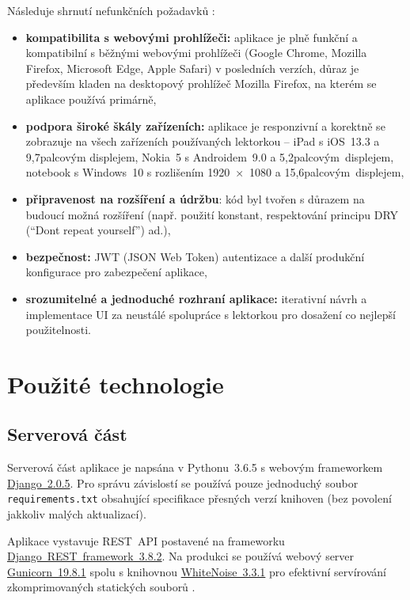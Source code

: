 Následuje shrnutí nefunkčních požadavků \cite{bp}:
\begin{itemize}
    \item \textbf{kompatibilita s webovými prohlížeči:} aplikace je plně funkční a kompatibilní s běžnými webovými prohlížeči (Google Chrome, Mozilla Firefox, Microsoft Edge, Apple Safari) v posledních verzích, důraz je především kladen na desktopový prohlížeč Mozilla Firefox, na kterém se aplikace používá primárně,
    \item \textbf{podpora široké škály zařízeních:} aplikace je responzivní a korektně se zobrazuje na všech zařízeních používaných lektorkou -- iPad s iOS~13.3 a 9,7palcovým displejem, Nokia~5 s Androidem~9.0 a 5,2palcovým~displejem, notebook s Windows~10 s rozlišením 1920~×~1080 a 15,6palcovým~displejem,
    \item \textbf{připravenost na rozšíření a údržbu}: kód byl tvořen s důrazem na budoucí možná rozšíření (např. použití konstant, respektování principu DRY (\enquote{Don\textquotesingle t repeat yourself}) ad.),
    \item \textbf{bezpečnost:} JWT (JSON Web Token) autentizace a další produkční konfigurace pro zabezpečení aplikace,
    \item \textbf{srozumitelné a jednoduché rozhraní aplikace:} iterativní návrh a implementace UI za neustálé spolupráce s lektorkou pro dosažení co nejlepší použitelnosti.
\end{itemize}


\section{Použité technologie}

\subsection{Serverová část}

Serverová část aplikace \cite{bp} je napsána v Pythonu~3.6.5 s webovým frameworkem \href{https://www.djangoproject.com/}{Django~2.0.5}. Pro správu závislostí se používá pouze jednoduchý soubor \verb|requirements.txt| obsahující specifikace přesných verzí knihoven (bez povolení jakkoliv malých aktualizací). 

Aplikace vystavuje REST~API postavené na frameworku \href{https://www.django-rest-framework.org/}{Django~REST~framework~3.8.2}. Na produkci se používá webový server \href{http://gunicorn.org/}{Gunicorn~19.8.1} spolu s knihovnou \href{http://whitenoise.evans.io/en/stable/}{WhiteNoise~3.3.1} pro efektivní servírování zkomprimovaných statických souborů \cite{whitenoise}.

